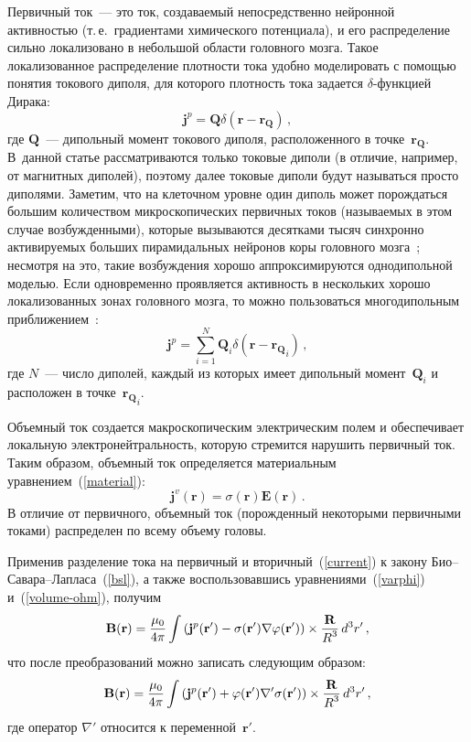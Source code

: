 \begin{multicols}{2}
Первичный ток~--- это ток, создаваемый непосредственно нейронной
активностью (т.\,е.\ градиентами химического потенциала), и его
распределение сильно локализовано в небольшой \mbox{области} головного
мозга. Такое локализованное распределение плотности тока удобно
моделировать с по\-мощью понятия токового диполя, для которого
плотность тока задается $\delta$-функ\-ци\-ей Дирака:
\begin{equation}
\label{dipole}
\mathbf{j}^p = \mathbf{Q}  \delta( \mathbf{r} - \mathbf{r_Q}) \,,
\end{equation}
где $\mathbf{Q}$~--- дипольный момент токового диполя,
расположенного в точке~$\mathbf{r_Q}$. В~данной статье
рассматриваются только токовые диполи (в отличие, например, от
магнитных диполей), поэтому далее токовые диполи будут называться
просто диполями. Заметим, что на клеточном уровне один диполь может
порождаться  большим количеством микроскопических первичных токов
(называемых в этом случае возбужденными), которые вызываются
десятками тысяч синхронно активируемых больших пирамидальных
нейронов коры головного мозга~\cite{baillet}; несмотря на это, такие
возбуждения хорошо аппроксимируются однодипольной моделью. Если
одновременно проявляется активность в нескольких хорошо
локализованных зонах головного мозга, то можно пользоваться
многодипольным приближением~\cite{mosher}:
\begin{equation*}
\mathbf{j}^p = \sum\limits_{i=1}^N \mathbf{Q}_i  \delta( \mathbf{r} - \mathbf{r_Q}_i) \,,
\end{equation*}
где $N$~--- число диполей, каждый из которых имеет дипольный момент~$\mathbf{Q}_i$
и расположен в точке~$\mathbf{r_Q}_i$.

Объемный ток создается макроскопическим электрическим полем и
обеспечивает локальную электронейтральность, которую стремится
нарушить первичный ток. Таким образом, объемный ток определяется
материальным уравнением~(\ref{material}):
\begin{equation}
\label{volume-ohm}
\mathbf{j}^v (\mathbf{r}) =  \sigma(\mathbf{r}) \mathbf{E(r)} \,.
\end{equation}
В отличие от первичного, объемный ток (порожденный
некоторыми первичными токами) распределен по всему объему головы.

Применив разделение тока на первичный и вторичный~(\ref{current}) к
закону Био--Са\-ва\-ра--Лап\-ла\-са~(\ref{bsl}), а также воспользовавшись
уравнениями~(\ref{varphi}) и~(\ref{volume-ohm}), получим
\begin{equation*}
\mathbf{B(r)} = \displaystyle\frac{\displaystyle \mu_0\mathstrut}{\displaystyle 4 \pi\mathstrut} \int \left(
\mathbf{j}^p \mathbf{(r')}  - \sigma(\mathbf{r'})
\nabla \varphi(\mathbf{r'})\right) \times \displaystyle\frac{\displaystyle \mathbf{R}\mathstrut}{\displaystyle R^3\mathstrut}\,  d^3 r' \,,
\end{equation*}
что после преобразований можно записать сле\-ду\-ющим образом:
\begin{equation}
\label{B2-varphi}
\mathbf{B(r)} = \displaystyle\frac{\displaystyle \mu_0\mathstrut}{\displaystyle 4 \pi\mathstrut} \int \left(
\mathbf{j}^p \mathbf{(r')}  + \varphi(\mathbf{r'}) \nabla'
\sigma(\mathbf{r'}) \right) \times \displaystyle\frac{\displaystyle \mathbf{R}\mathstrut}{\displaystyle R^3\mathstrut} \, d^3 r' \,,
\end{equation}
где оператор $\nabla'$ относится к переменной~$\mathbf{r'}$.


\end{multicols}
